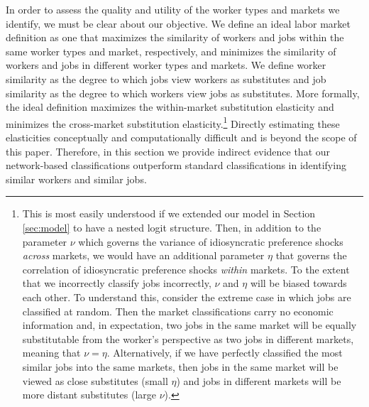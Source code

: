\documentclass[12pt]{article}
\theoremstyle{definition}
\theoremstyle{plain}
\begin{document}
In order to assess the quality and utility of the worker types and markets we identify, we must be clear about our objective. We define an ideal labor market definition as one that maximizes the similarity of workers and jobs within the same worker types and market, respectively, and minimizes the similarity of workers and jobs in different worker types and markets. We define worker similarity as the degree to which jobs view workers as substitutes and job similarity as the degree to which workers view jobs as substitutes. More formally, the ideal definition maximizes the within-market substitution elasticity and minimizes the cross-market substitution elasticity.\footnote{This is most easily understood if we extended our model in Section \ref{sec:model} to have a nested logit structure. Then, in addition to the parameter $\nu$ which governs the variance of idiosyncratic preference shocks \emph{across} markets, we would have an additional parameter $\eta$ that governs the correlation of idiosyncratic preference shocks \emph{within} markets. To the extent that we incorrectly classify jobs incorrectly, $\nu$ and $\eta$ will be biased towards each other. To understand this, consider the extreme case in which jobs are classified at random. Then the market classifications carry no economic information and, in expectation, two jobs in the same market will be equally substitutable from the worker's perspective as two jobs in different markets, meaning that $\nu=\eta$. Alternatively, if we have perfectly classified the most similar jobs into the same markets, then jobs in the same market will be viewed as close substitutes (small $\eta$) and jobs in different markets will be more distant substitutes (large $\nu$). } Directly estimating these elasticities conceptually and computationally difficult and is beyond the scope of this paper. Therefore, in this section we provide indirect evidence that our network-based classifications outperform standard classifications in identifying similar workers and similar jobs. 
\end{document}
